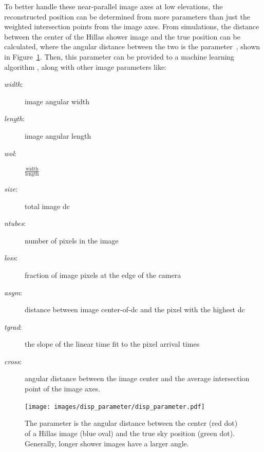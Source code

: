     To better handle these near-parallel image axes at low elevations, the reconstructed position can be determined from more parameters than just the weighted intersection points from the image axes.
    From simulations, the distance between the center of the Hillas shower image and the true position can be calculated, where the angular distance between the two is the \disp{} parameter~\cite{Senturk:2011}, shown in Figure~\ref{fig:dispdiagram}.
    Then, this \disp{} parameter can be provided to a machine learning algorithm \cite{Beilicke2012NIM}, along with other image parameters like:
    \begin{description}
      \item[\textit{width}:] image angular width
      \item[\textit{length}:] image angular length
      \item[\textit{wol}:] $\frac{\textrm{width}}{\textrm{length}}$
      \item[\textit{size}:] total image dc
      \item[\textit{ntubes}:] number of pixels in the image
      \item[\textit{loss}:] fraction of image pixels at the edge of the camera
      \item[\textit{asym}:] distance between image center-of-dc and the pixel with the highest dc
      \item[\textit{tgrad}:] the slope of the linear time fit to the pixel arrival times
      \item[\textit{cross}:] angular distance between the image center and the average intersection point of the image axes.
    \end{description}


    \begin{figure}[ht]
      \centering
      \texttt{[image: images/disp\_parameter/disp\_parameter.pdf]}
      \caption[Angular Reconstruction Disp]{
        The \disp{} parameter is the angular distance between the center (red dot) of a Hillas image (blue oval) and the true sky position (green dot).
        Generally, longer shower images have a larger \disp{} angle.
      }
      \label{fig:dispdiagram}
    \end{figure}

